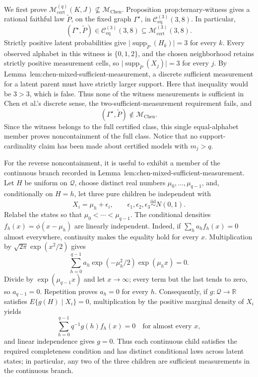 We first prove \(\mathcal M_{\mathrm{cert}}^{(q)}(K,J)\not\subseteq\mathcal M_{\mathrm{Chen}}\).  Proposition~\textnormal{prop:ternary-witness} gives a rational faithful law \(\widetilde P\), on the fixed graph \(\Gamma^{\star}\), in
\(\mathcal C_{\mathrm{eq}}^{(3)}(3,8)\).  In particular,
\[
 (\Gamma^{\star},\widetilde P)
 \in\mathcal C_{\mathrm{eq}}^{(3)}(3,8)
 \subseteq\mathcal M_{\mathrm{cert}}^{(3)}(3,8).
\]
Strictly positive latent probabilities give
\(\lvert\operatorname{supp}_{\widetilde P}(H_k)\rvert=3\) for every \(k\).  Every observed alphabet in this witness is \(\{0,1,2\}\), and the chosen neighborhood retains strictly positive measurement cells, so
\(\lvert\operatorname{supp}_{\widetilde P}(X_j)\rvert=3\) for every \(j\).  By Lemma~\textnormal{lem:chen-mixed-sufficient-measurement}, a discrete sufficient measurement for a latent parent must have strictly larger support.  Here that inequality would be \(3>3\), which is false.  Thus none of the witness measurements is sufficient in Chen et al.'s discrete sense, the two-sufficient-measurement requirement fails, and
\[
 (\Gamma^{\star},\widetilde P)\notin\mathcal M_{\mathrm{Chen}}.
\]
Since the witness belongs to the full certified class, this single equal-alphabet member proves noncontainment of the full class.  Notice that no support-cardinality claim has been made about certified models with \(m_j>q\).

For the reverse noncontainment, it is useful to exhibit a member of the continuous branch recorded in Lemma~\textnormal{lem:chen-mixed-sufficient-measurement}.  Let \(H\) be uniform on \(\mathcal Q\), choose distinct real numbers \(\mu_0,\ldots,\mu_{q-1}\), and, conditionally on \(H=h\), let three pure children be independent with
\[
 X_i=\mu_h+\epsilon_i,\qquad
 \epsilon_1,\epsilon_2,\epsilon_3\stackrel{\mathrm{iid}}{\sim}N(0,1).
\]
Relabel the states so that \(\mu_0<\cdots<\mu_{q-1}\).  The conditional densities \(f_h(x)=\phi(x-\mu_h)\) are linearly independent.  Indeed, if
\(\sum_h a_h f_h(x)=0\) almost everywhere, continuity makes the equality hold for every \(x\).  Multiplication by \(\sqrt{2\pi}\exp(x^2/2)\) gives
\[
 \sum_{h=0}^{q-1}a_h\exp(-\mu_h^2/2)\exp(\mu_h x)=0.
\]
Divide by \(\exp(\mu_{q-1}x)\) and let \(x\to\infty\); every term but the last tends to zero, so \(a_{q-1}=0\).  Repetition proves \(a_h=0\) for every \(h\).  Consequently, if \(g:\mathcal Q\to\mathbb R\) satisfies \(E\{g(H)\mid X_i\}=0\), multiplication by the positive marginal density of \(X_i\) yields
\[
 \sum_{h=0}^{q-1}q^{-1}g(h)f_h(x)=0
 \quad\text{for almost every }x,
\]
and linear independence gives \(g=0\).  Thus each continuous child satisfies the required completeness condition and has distinct conditional laws across latent states; in particular, any two of the three children are sufficient measurements in the continuous branch.

